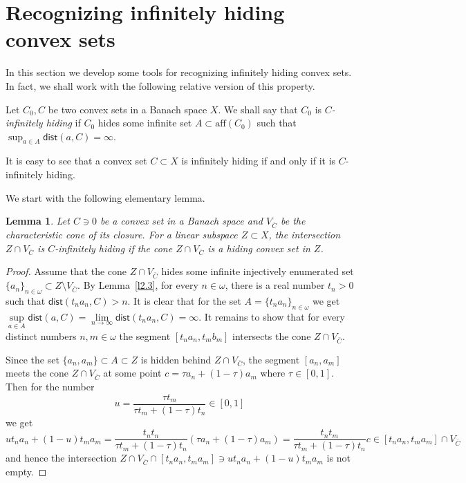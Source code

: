 \documentclass{amsart}
\newcommand{\w}{\omega}
\newcommand{\dist}{\mathsf{dist}}
\newcommand{\aff}{\mathrm{aff}}
\newtheorem{lemma}[theorem]{Lemma}
\theoremstyle{definition}
\begin{document}
\section{Recognizing infinitely hiding convex sets}

In this section we develop some tools for recognizing infinitely hiding convex sets.
In fact, we shall work with the following relative version of this property.

Let $C_0,C$ be two convex sets in a Banach space $X$. We shall say that $C_0$ is {\em $C$-infinitely hiding} if $C_0$ hides some infinite set $A\subset\aff(C_0)$ such that $\sup_{a\in A}\dist(a,C)=\infty$.

It is easy to see that a convex set $C\subset X$ is infinitely hiding if and only if it is $C$-infinitely hiding.

We start with the following elementary lemma.


\begin{lemma}\label{l5.1} Let $C\ni 0$ be a convex set in a Banach space and $V_{\bar C}$ be the characteristic cone of its closure. For a linear subspace $Z\subset X$, the intersection $Z\cap V_{\bar C}$ is $C$-infinitely hiding if the cone $Z\cap V_{\bar C}$ is a hiding convex set in $Z$.
\end{lemma}

\begin{proof} Assume that the cone $Z\cap V_{\bar C}$ hides some infinite injectively enumerated set $\{a_n\}_{n\in\w}\subset Z\setminus V_{\bar C}$. By Lemma~\ref{l2.3}, for every $n\in\w$, there is a real number $t_n>0$ such that $\dist(t_n a_n,C)>n$. It is clear that for the set $A=\{t_na_n\}_{n\in\w}$ we get $\sup\limits_{a\in A}\dist(a,C)=\lim\limits_{n\to\infty}\dist(t_na_n,C)=\infty$. It remains to show that for every distinct numbers $n,m\in\w$ the segment $[t_na_n,t_mb_m]$ intersects the cone $Z\cap V_{\bar C}$.

Since the set $\{a_n,a_m\}\subset A\subset Z$ is hidden behind $Z\cap V_{\bar C}$, the segment $[a_n,a_m]$ meets the cone $Z\cap V_{\bar C}$ at some point $c=\tau a_n+(1-\tau)a_m$ where $\tau\in[0,1]$. Then for the number
$$u=\frac{\tau t_m}{\tau t_m+(1-\tau)t_n}\in[0,1]$$we get
$$
ut_na_n+(1-u)t_ma_m=\frac{t_nt_n}{\tau t_m+(1-\tau)t_n}(\tau a_n+(1-\tau)a_m)=\frac{t_nt_m}{\tau t_m+(1-\tau)t_n}c\in [t_na_n,t_ma_m]\cap V_{\bar C}
$$and hence the intersection $Z\cap V_{\bar C}\cap[t_na_n,t_ma_m]\ni ut_na_n+(1-u)t_ma_m$ is not empty.
\end{proof}
\end{document}

